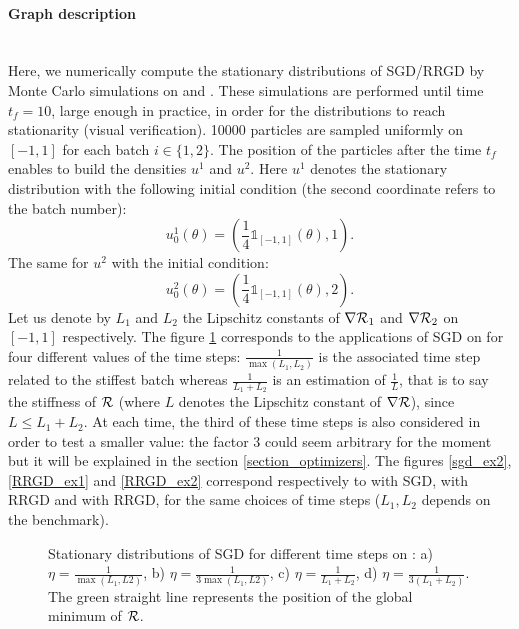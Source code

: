 \paragraph{Graph description}
~~\\
Here, we numerically compute the stationary distributions of SGD/RRGD by Monte Carlo simulations on \exOne and \exTwo. These simulations are performed until time $t_f=10$, large
enough in practice, in order for the distributions to reach stationarity (visual verification). 10000 particles are sampled uniformly on $[-1,1]$ for each batch $i\in \{1,2\}$. The position of the particles after the time $t_f$ enables to build the densities $u^1$ and $u^2$. Here $u^1$ denotes the stationary distribution with the following initial condition (the second coordinate refers to the batch number):
\begin{equation*}
	u^1_0(\theta) = \left(\frac{1}{4} \mathds{1}_{[-1,1]}(\theta),1\right).
\end{equation*}
The same for $u^2$ with the initial condition:
\begin{equation*}
	u^2_0(\theta) = \left(\frac{1}{4} \mathds{1}_{[-1,1]}(\theta),2\right).
\end{equation*}
Let us denote by $L_1$ and $L_2$ the Lipschitz constants of $\nabla \mathcal{R}_1$ and $\nabla \mathcal{R}_2$ on $[-1,1]$ respectively. The figure \ref{sgd_ex1} corresponds to the applications of SGD on \exOne
for four different values of the time steps: $\frac{1}{\max(L_1,L_2)}$ is the associated time step related to the stiffest batch whereas $\frac{1}{L_1+L_2}$ is an estimation of
$\frac{1}{L}$, that is to say the stiffness of $\mathcal{R}$ (where $L$ denotes the Lipschitz constant of $\nabla \mathcal{R}$), since $L \leq L_1+L_2$. At each time, the third of these time steps is also
considered in order to test a smaller value: the factor 3 could seem arbitrary for the moment but it will be explained in the section \ref{section_optimizers}. The figures
\ref{sgd_ex2}, \ref{RRGD_ex1} and \ref{RRGD_ex2} correspond respectively to \exTwo with SGD, \exOne with RRGD and \exTwo with RRGD, for the same choices of time steps ($L_1,L_2$ depends on the benchmark). 

\begin{figure}[!h]
	\centering
	\scalebox{0.45}{}
	\caption{Stationary distributions of SGD for different time steps on \exOne: a) $\eta=\frac{1}{\max(L_1,L2)}$, b) $\eta=\frac{1}{3\max(L_1,L2)}$, c) $\eta=\frac{1}{L_1+L_2}$, d) $\eta=\frac{1}{3(L_1+L_2)}$. The green straight line represents the position of the global minimum of $\mathcal{R}$.}
	\label{sgd_ex1}
\end{figure}

